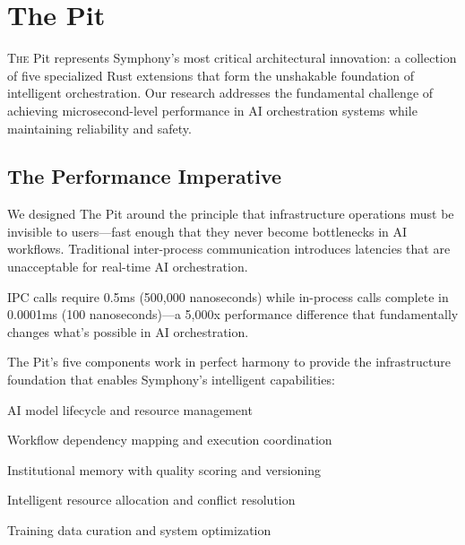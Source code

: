 
\section*{The Pit}

\lettrine{T}{he} Pit represents Symphony's most critical architectural innovation: a collection of five specialized Rust extensions that form the unshakable foundation of intelligent orchestration. Our research addresses the fundamental challenge of achieving microsecond-level performance in AI orchestration systems while maintaining reliability and safety.

\subsection*{The Performance Imperative}

We designed The Pit around the principle that infrastructure operations must be invisible to users—fast enough that they never become bottlenecks in AI workflows. Traditional inter-process communication introduces latencies that are unacceptable for real-time AI orchestration.

\begin{infobox}[title=The Performance Gap]
IPC calls require 0.5ms (500,000 nanoseconds) while in-process calls complete in 0.0001ms (100 nanoseconds)—a 5,000x performance difference that fundamentally changes what's possible in AI orchestration.
\end{infobox}

The Pit's five components work in perfect harmony to provide the infrastructure foundation that enables Symphony's intelligent capabilities:

\begin{description}[leftmargin=3cm,labelwidth=2.5cm]
    \item[\textbf{Pool Manager}] AI model lifecycle and resource management
    \item[\textbf{DAG Tracker}] Workflow dependency mapping and execution coordination
    \item[\textbf{Artifact Store}] Institutional memory with quality scoring and versioning
    \item[\textbf{Arbitration Engine}] Intelligent resource allocation and conflict resolution
    \item[\textbf{Stale Manager}] Training data curation and system optimization
\end{description}

